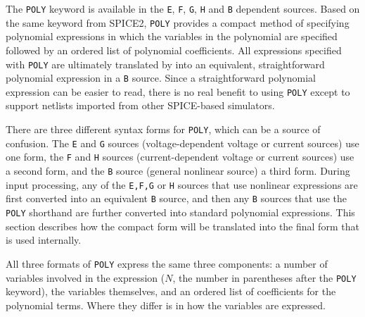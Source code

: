 



The \texttt{POLY} keyword is available in the \texttt{E}, \texttt{F},
\texttt{G}, \texttt{H} and \texttt{B} dependent sources. Based on the same
keyword from SPICE2, \texttt{POLY} provides a compact method of specifying
polynomial expressions in which the variables in the polynomial are specified
followed by an ordered list of polynomial coefficients.  All expressions
specified with \texttt{POLY} are ultimately translated by \Xyce{} into an
equivalent, straightforward polynomial expression in a \texttt{B} source.
Since a straightforward polynomial expression can be easier to read, there is
no real benefit to using \texttt{POLY} except to support netlists imported from
other SPICE-based simulators.

There are three different syntax forms for \texttt{POLY}, which can be
a source of confusion.  The \texttt{E} and \texttt{G} sources
(voltage-dependent voltage or current sources) use one form, the
\texttt{F} and \texttt{H} sources (current-dependent voltage or
current sources) use a second form, and the \texttt{B} source (general
nonlinear source) a third form.  During input processing, any of the
\texttt{E,F,G} or \texttt{H} sources that use nonlinear expressions
are first converted into an equivalent \texttt{B} source, and then any
\texttt{B} sources that use the \texttt{POLY} shorthand are further
converted into standard polynomial expressions.  This section describes
how the compact form will be translated into the final form that is
used internally.

All three formats of \texttt{POLY} express the same three components:
a number of variables involved in the expression ($N$, the number in
parentheses after the \texttt{POLY} keyword), the variables
themselves, and an ordered list of coefficients for the polynomial
terms.  Where they differ is in how the variables are expressed.

